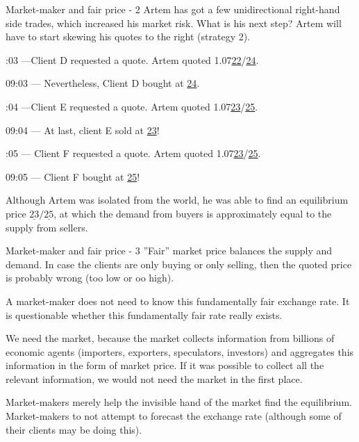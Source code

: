 \documentclass{beamer}
\begin{document}
\begin{frame}{Market-maker and fair price - 2}
\justify
Artem has got a few unidirectional right-hand side trades, which increased his market risk. What is his next step? Artem will have to start skewing his quotes to the right (strategy 2).

:03 ---Client D requested a quote. Artem quoted 1.07\underline{22}/\underline{24}.

09:03 --- Nevertheless, Client D bought at \underline{24}.

:04 ---Client E requested a quote. Artem quoted 1.07\underline{23}/\underline{25}.

09:04 --- At last, client E sold at \underline{23}!

:05 --- Client F requested a quote. Artem quoted 1.07\underline{23}/\underline{25}.

09:05 --- Client F bought at  \underline{25}!

\justify
Although Artem was isolated from the world, he was able to find an equilibrium price $\underline{23}/\underline{25}$, at which the demand from buyers is approximately equal to the supply from sellers.
\end{frame}



\begin{frame}{Market-maker and fair price - 3}
\justify
''Fair'' market price balances the supply and demand. In case the clients are only buying or only selling, then the quoted price
is probably wrong (too low or oo high).

\justify
A market-maker does not need to know this fundamentally fair exchange rate. It is questionable whether this
fundamentally fair rate really exists.

\justify
We need the market, because the market collects information from billions of economic agents (importers, exporters, speculators, investors) and aggregates this information in the form of market price. If it was possible to collect all the relevant information, we would not need the market in the first place.

\justify
Market-makers merely help the invisible hand of the market find the equilibrium. Market-makers to not attempt to forecast the exchange rate (although some of their clients may be doing this).
\end{frame}
\end{document}
